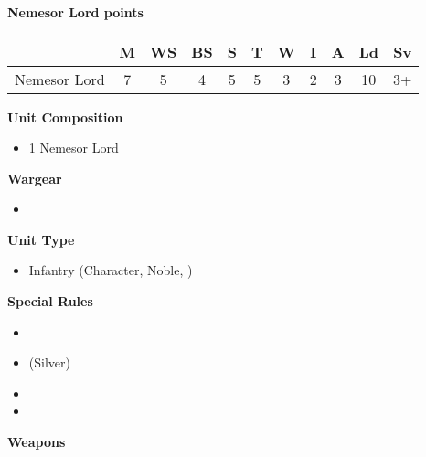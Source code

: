 \newpage
\subsubsection[Nemesor Lord]{}

\begin{minipage}[t]{0.72\textwidth}
	{\large \textbf{Nemesor Lord  points}}
	
	\begin{tabular}{m{165 pt} *{10}{c}}
		& M & WS & BS & S & T & W & I & A & Ld & Sv \\
		\hline
		Nemesor Lord & 7 & 5 & 4 & 5 & 5 & 3 & 2 & 3 & 10 & 3+ \\
	\end{tabular}
	\small
	\begin{minipage}{0.5\textwidth}
		\vspace*{2em}
		\textbf{Unit Composition}
		\begin{itemize}
			\item 1 Nemesor Lord
		\end{itemize}
		
		\textbf{Wargear}
		\begin{itemize}
			\item {}
		\end{itemize}
	\end{minipage}
	\begin{minipage}{0.5\textwidth}
		\vspace*{2em}
		\textbf{Unit Type}
		\begin{itemize}
			\item Infantry (Character, Noble, )
		\end{itemize}
		
		\textbf{Special Rules}
		\begin{itemize}
			\item {}
			\item {} (Silver)
			\item {}
			\item {}
		\end{itemize}
	\end{minipage}
	
	\vspace*{2em}
	\textbf{Weapons}
	

\end{minipage}
